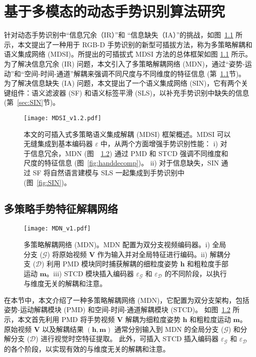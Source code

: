 
\chapter{基于多模态的动态手势识别算法研究}
\label{sec:GR}
针对动态手势识别中“信息冗余（IR）”和 “信息缺失（IA）”的挑战，如图~\ref{fig:MDSI} 所示，本文提出了一种用于 RGB-D 手势识别的新型可插拔方法，称为多策略解耦和语义集成网络 (MDSI)。所提出的可插拔式 MDSI 方法的总体框架如图 \ref{fig:MDSI} 所示。为了解决信息冗余 (IR) 问题，本文引入了多策略解耦网络 (MDN)，通过“姿势-运动”和“空间-时间-通道”解耦来强调不同尺度与不同维度的特征信息 (第~\ref{sec:MDN}节)。
为了解决信息缺失 (IA) 问题，本文提出了一个语义集成网络 (SIN)，它有两个关键组件：语义滤波器 (SF) 和语义标签平滑 (SLS)，以补充手势识别中缺失的信息 (第~\ref{sec:SIN}节)。
\begin{figure}[tb]
  \centering
  \texttt{[image: MDSI\_v1.2.pdf]}%
  \caption{本文的可插入式多策略语义集成解耦 (MDSI) 框架概述。MDSI 可以无缝集成到基本编码器 $\varepsilon$ 中，从两个方面增强手势识别性能：
  i) 对于信息冗余，MDN (图~~\ref{fig:MDN}) 通过 PMD 和 STCD 强调不同维度和尺度的特征信息 (图~\ref{fig:handdecomp})。
  ii) 对于信息缺失，SIN 通过 SF 将自然语言建模与 SLS 一起集成到手势识别中 (图~\ref{fig:SIN})。}
  \label{fig:MDSI}
\end{figure}

\section{多策略手势特征解耦网络}
\label{sec:MDN}
\begin{figure}[tb]
  \centering
  \texttt{[image: MDN\_v1.pdf]}
    \caption{多策略解耦网络 (MDN)。MDN 配置为双分支视频编码器。i) 全局分支 ($\mathcal{G}$) 将原始视频 $\mathbf{V}$ 作为输入并对全局特征进行编码。ii) 解耦分支 ($\mathcal{D}$) 利用 PMD 模块同时捕获解耦的细粒度姿势 $\mathbf{h}$ 和粗粒度手部运动 $\mathbf{m}$。iii) STCD 模块插入编码器 $\varepsilon_{\mathcal{G}}$ 和 $\varepsilon_{\mathcal{D}}$ 的不同阶段，以执行与维度无关的解耦和注意。}
  \label{fig:MDN}
\end{figure}

在本节中，本文介绍了一种多策略解耦网络 (MDN)，它配置为双分支架构，包括姿势-运动解耦模块 (PMD) 和空间-时间-通道解耦模块 (STCD)。
如图~\ref{fig:MDN} 所示，本文首先利用 PMD 将手势视频 $\mathbf{V}$ 解耦为细粒度姿势 $\mathbf{h}$ 和粗粒度运动 $\mathbf{m}$。原始视频 $\mathbf{V}$ 以及解耦结果 $\mathbf{(h, m)}$ 通常分别输入到 MDN 的全局分支 ($\mathcal{G}$) 和分解分支 ($\mathcal{D}$) 进行视觉时空特征提取。
此外，可插入 STCD 插入编码器 $\varepsilon_{\mathcal{G}}$ 和 $\varepsilon_{\mathcal{D}}$ 的各个阶段，以实现有效的与维度无关的解耦和注意。

